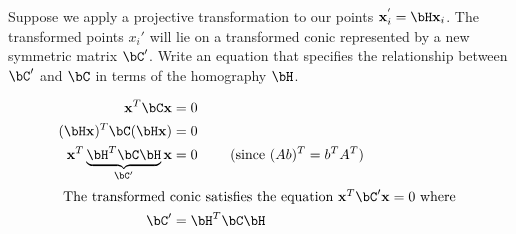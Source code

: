 \begin{problem}
\begin{enumalph}
    \newpage
    \item Suppose we apply a projective transformation to our
      points $\bx_i^{'} = \bH\bx_i$.
      The transformed points $x_i'$ will lie on a transformed
      conic represented by a new symmetric matrix $\bC'$.
      Write an equation that specifies the relationship between
      $\bC'$ and $\bC$ in terms of the homography $\bH$.
      \begin{answer}
        \begin{align*}
          \bx^T\bC\bx &= 0 \\
          (\bH\bx)^T\bC(\bH\bx) &= 0 \\
          \bx^T \underbrace{\bH^T\bC\bH}_{\bC'}\bx &= 0 \qquad \text{ (since ${(Ab)^T = b^TA^T}$) } \\
          \intertext{
            The transformed conic satisfies the equation
            $\bx^T\bC'\bx = 0$ where
          }
          \bC' &= \bH^T\bC\bH
        \end{align*}
      \end{answer}
  \end{enumalph}
\end{problem}
